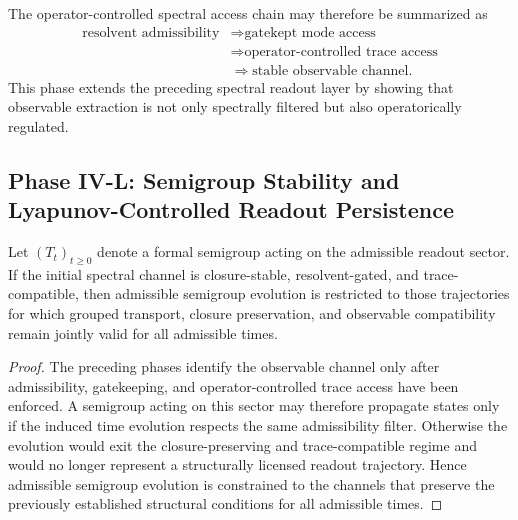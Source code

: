 \begin{remark}\label{rem:resolvent_to_readout_chain}
The operator-controlled spectral access chain may therefore be summarized as
\[
\begin{aligned}
\text{resolvent admissibility}
&\Longrightarrow \text{gatekept mode access}\\
&\Longrightarrow \text{operator-controlled trace access}\\
&\Longrightarrow \text{stable observable channel}.
\end{aligned}
\]
This phase extends the preceding spectral readout layer by showing that observable extraction is not only spectrally filtered but also operatorically regulated.
\end{remark}



\subsection*{Phase IV-L: Semigroup Stability and Lyapunov-Controlled Readout Persistence}

\begin{lemma}\label{lem:semigroup_admissibility}
Let $(T_t)_{t\ge 0}$ denote a formal semigroup acting on the admissible readout sector. If the initial spectral channel is closure-stable, resolvent-gated, and trace-compatible, then admissible semigroup evolution is restricted to those trajectories for which grouped transport, closure preservation, and observable compatibility remain jointly valid for all admissible times.
\end{lemma}
\begin{proof}
The preceding phases identify the observable channel only after admissibility, gatekeeping, and operator-controlled trace access have been enforced. A semigroup acting on this sector may therefore propagate states only if the induced time evolution respects the same admissibility filter. Otherwise the evolution would exit the closure-preserving and trace-compatible regime and would no longer represent a structurally licensed readout trajectory. Hence admissible semigroup evolution is constrained to the channels that preserve the previously established structural conditions for all admissible times.
\end{proof}


